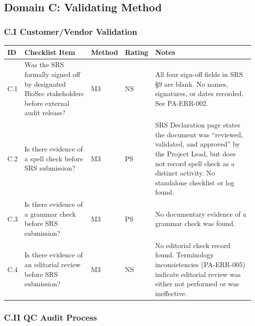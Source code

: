 \documentclass[11pt,a4paper]{article}
\begin{document}
\subsection{Domain C: Validating Method}

\subsubsection{C.I Customer/Vendor Validation}

\begin{longtable}{|L{0.8cm}|L{4cm}|L{1.3cm}|L{1.3cm}|L{5.5cm}|}
\hline
{}
\textbf{ID} & \textbf{Checklist Item} & \textbf{Method} & \textbf{Rating} & \textbf{Notes} \\
\hline
\endhead
C.1 & Was the SRS formally signed off by designated BioSec stakeholders before external audit release? & M3 & NS & All four sign-off fields in SRS \S9 are blank. No names, signatures, or dates recorded. See PA-ERR-002. \\\hline
C.2 & Is there evidence of a spell check before SRS submission? & M3 & PS & SRS Declaration page states the document was ``reviewed, validated, and approved'' by the Project Lead, but does not record spell check as a distinct activity. No standalone checklist or log found. \\\hline
C.3 & Is there evidence of a grammar check before SRS submission? & M3 & PS & No documentary evidence of a grammar check was found. \\\hline
C.4 & Is there evidence of an editorial review before SRS submission? & M3 & NS & No editorial check record found. Terminology inconsistencies (PA-ERR-005) indicate editorial review was either not performed or was ineffective. \\\hline
\end{longtable}

\subsubsection{C.II QC Audit Process}
\end{document}
